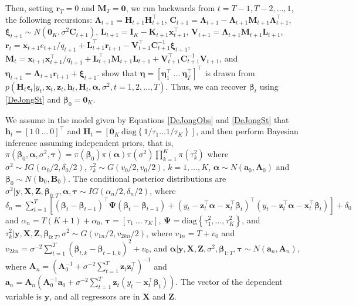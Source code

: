 Then, setting $\bm{r}_T=0$ and $\bm{M}_T=\bm{0}$, we run backwards from $t=T-1, T-2, \dots, 1$, the following recursions: $\bm{\Lambda}_{t+1}=\bm{H}_{t+1}\bm{H}_{t+1}^{\top}$, $\bm{C}_{t+1}=\bm{\Lambda}_{t+1}-\bm{\Lambda}_{t+1}\bm{M}_{t+1}\bm{\Lambda}_{t+1}^{\top}$, $\bm{\xi}_{t+1}\sim N(\bm{0}_K,\sigma^2\bm{C}_{t+1})$, $\bm{L}_{t+1}=\bm{I}_K-\bm{K}_{t+1}\bm{x}_{t+1}^{\top}$, $\bm{V}_{t+1}=\bm{\Lambda}_{t+1}\bm{M}_{t+1}\bm{L}_{t+1}$, $\bm{r}_{t}=\bm{x}_{t+1} e_{t+1}/q_{t+1} + \bm{L}_{t+1}^{\top}\bm{r}_{t+1}-\bm{V}_{t+1}^{\top}\bm{C}_{t+1}^{-1}\bm{\xi}_{t+1}$, $\bm{M}_{t}=\bm{x}_{t+1}\bm{x}_{t+1}^{\top}/q_{t+1}+\bm{L}_{t+1}^{\top}\bm{M}_{t+1}\bm{L}_{t+1}+\bm{V}_{t+1}^{\top}\bm{C}_{t+1}^{-1}\bm{V}_{t+1}$, and $\bm{\eta}_{t+1}=\bm{\Lambda}_{t+1}\bm{r}_{t+1}+\bm{\xi}_{t+1}$. \cite{de1995simulation} show that $\bm{\eta}=[\bm{\eta}_1^{\top} \ \dots \ \bm{\eta}_T^{\top}]^{\top}$ is drawn from $p(\bm{H}_t\bm{\epsilon}_t|y_t,\bm{x}_t,\bm{z}_t,\bm{h}_t,\bm{H}_t,\bm{\alpha},\sigma^2, t=1,2,\dots,T)$. Thus, we can recover $\bm{\beta}_t$ using \ref{DeJongSt} and $\bm{\beta}_0=\bm{0}_K$.

We assume in the model given by Equations \ref{DeJongObs} and \ref{DeJongSt} that $\bm{h}_t=[1 \ 0 \ \dots \ 0]^{
\top}$ and $\bm{H}_t=[\bm{0}_K \ \text{diag}\left\{1/\tau_1\dots1/\tau_K\right\}]$, and then perform Bayesian inference assuming independent priors, that is, $\pi(\bm{\beta}_0,\bm{\alpha},\sigma^2,\bm{\tau})=\pi(\bm{\beta}_0)\pi(\bm{\alpha})\pi(\sigma^2)\prod_{k=1}^K\pi(\tau_k^2)$ where $\sigma^2\sim IG(\alpha_0/2,\delta_0/2)$, $\tau_k^2\sim G(v_{0}/2,v_{0}/2)$, $k=1,\dots,K$, $\bm{\alpha}\sim N(\bm{a}_0,\bm{A}_0)$ and $\bm{\beta}_0\sim N(\bm{b}_0,\bm{B}_0)$. The conditional posterior distributions are $\sigma^2|\bm{y},\bm{X},\bm{Z},\bm{\beta}_{0:T},\bm{\alpha},\bm{\tau}\sim IG(\alpha_{n}/2,\delta_n/2)$, where $\delta_n=\sum_{t=1}^T\left[(\bm{\beta}_t-\bm{\beta}_{t-1})^{\top}\bm{\Psi}(\bm{\beta}_t-\bm{\beta}_{t-1})+(y_t-\bm{z}_t^{\top}\bm{\alpha}-\bm{x}_t^{\top}\bm{\beta}_t)^{\top}(y_t-\bm{z}_t^{\top}\bm{\alpha}-\bm{x}_t^{\top}\bm{\beta}_t)\right]+\delta_0$ and  $\alpha_{n}=T(K+1)+\alpha_0$, $\bm{\tau}=[\tau_1 \ \dots \ \tau_K]$, $\bm{\Psi}=\text{diag}\left\{\tau_1^2,\dots,\tau_K^2\right\}$, and $\tau_k^2|\bm{y},\bm{X},\bm{Z},\bm{\beta}_{0:T},\sigma^2\sim G(v_{1n}/2,v_{2kn}/2)$, where $v_{1n}=T+v_{0}$ and $v_{2kn}=\sigma^{-2}\sum_{t=1}^T(\bm{\beta}_{t,k}-\bm{\beta}_{t-1,k})^2+v_{0}$, and $\bm{\alpha}|\bm{y},\bm{X},\bm{Z},\sigma^2,\bm{\beta}_{1:T},\bm{\tau}\sim N(\bm{a}_n,\bm{A}_n)$, where $\bm{A}_n=(\bm{A}_0^{-1}+\sigma^{-2}\sum_{t=1}^T\bm{z}_t\bm{z}_t^{\top})^{-1}$ and $\bm{a}_n=\bm{A}_n(\bm{A}_0^{-1}\bm{a}_0+\sigma^{-2}\sum_{t=1}^T\bm{z}_t(y_t-\bm{x}_t^{\top}\bm{\beta}_t))$. The vector of the dependent variable is $\bm{y}$, and all regressors are in $\bm{X}$ and $\bm{Z}$.

